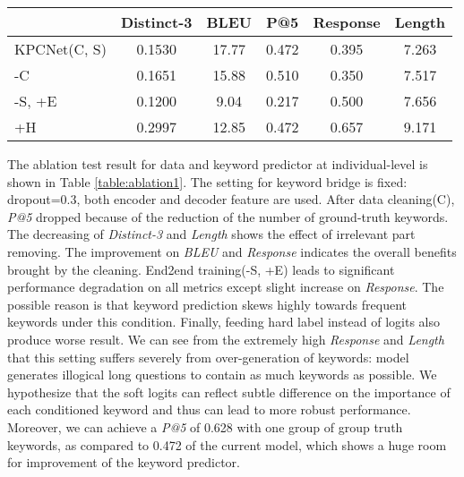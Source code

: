 \documentclass[letterpaper]{article} %
\begin{document}
\begin{table*}[htbp]
  \centering
\begin{tabular}{l|ccccc}
\hline
{} & Distinct-3 & BLEU & P@5 & Response & Length \\
\hline
KPCNet(C, S) & 0.1530 & 17.77 & 0.472 & 0.395 & 7.263 \\
-C & 0.1651 & 15.88 & 0.510 & 0.350 & 7.517 \\
-S, +E & 0.1200 & 9.04 & 0.217 & 0.500 & 7.656 \\
+H & 0.2997 & 12.85 & 0.472 & 0.657 & 9.171 \\
\hline
\end{tabular}
\caption{\label{table:ablation1} Ablation test results on \texttt{Home \& Kitchen} for data and keyword predictor at individual-level. The first line is final adopted setting.}
\end{table*}

The ablation test result for data and keyword predictor at individual-level is shown in Table \ref{table:ablation1}. The setting for keyword bridge is fixed: dropout=0.3, both encoder and decoder feature are used. After data cleaning(C), \textit{P@5} dropped because of the reduction of the number of ground-truth keywords. The decreasing of \textit{Distinct-3} and \textit{Length} shows the effect of irrelevant part removing. The improvement on \textit{BLEU} and \textit{Response} indicates the overall benefits brought by the cleaning. End2end training(-S, +E) leads to significant performance degradation on all metrics except slight increase on \textit{Response}. The possible reason is that keyword prediction skews highly towards frequent keywords under this condition. Finally, feeding hard label instead of logits also produce worse result. We can see from the extremely high \textit{Response} and \textit{Length} that this setting suffers severely from over-generation of keywords: model generates illogical long questions to contain as much keywords as possible. We hypothesize that the soft logits can reflect subtle difference on the importance of each conditioned keyword and thus can lead to more robust performance. Moreover, we can achieve a \textit{P@5} of 0.628 with one group of group truth keywords, as compared to 0.472 of the current model, which shows a huge room for improvement of the keyword predictor.
\end{document}
